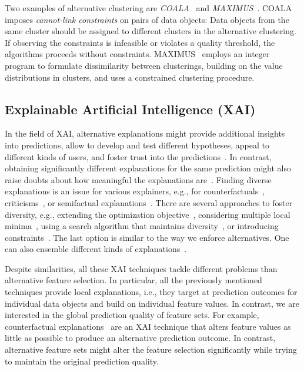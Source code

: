 \documentclass{article}
\theoremstyle{definition}
\begin{document}
Two examples of alternative clustering are \emph{COALA}~\cite{bae2006coala} and \emph{MAXIMUS}~\cite{bae2010clustering}.
COALA~\cite{bae2006coala} imposes \emph{cannot-link constraints} on pairs of data objects:
Data objects from the same cluster should be assigned to different clusters in the alternative clustering.
If observing the constraints is infeasible or violates a quality threshold, the algorithms proceeds without constraints.
MAXIMUS~\cite{bae2010clustering} employs an integer program to formulate dissimilarity between clusterings, building on the value distributions in clusters, and uses a constrained clustering procedure.

\subsection{Explainable Artificial Intelligence (XAI)}

In the field of XAI, alternative explanations might provide additional insights into predictions, allow to develop and test different hypotheses, appeal to different kinds of users, and foster trust into the predictions~\cite{kim2021multi, wang2019designing}.
In contrast, obtaining significantly different explanations for the same prediction might also raise doubts about how meaningful the explanations are~\cite{jain2019attention}.
Finding diverse explanations is an issue for various explainers, e.g., for counterfactuals~\cite{dandl2020multi, karimi2020model, mohammadi2021scaling, mothilal2020explaining, russell2019efficient, wachter2017counterfactual}, criticisms~\cite{kim2016examples}, or semifactual explanations~\cite{artelt2022even}.
There are several approaches to foster diversity, e.g., extending the optimization objective~\cite{artelt2022even, kim2016examples, mothilal2020explaining}, considering multiple local minima~\cite{wachter2017counterfactual}, using a search algorithm that maintains diversity~\cite{dandl2020multi}, or introducing constraints~\cite{karimi2020model, mohammadi2021scaling, russell2019efficient}.
The last option is similar to the way we enforce alternatives.
One can also ensemble different kinds of explanations~\cite{silva2019produce}.

Despite similarities, all these XAI techniques tackle different problems than alternative feature selection.
In particular, all the previously mentioned techniques provide local explanations, i.e., they target at prediction outcomes for individual data objects and build on individual feature values.
In contrast, we are interested in the global prediction quality of feature sets.
For example, counterfactual explanations~\cite{guidotti2022counterfactual, stepin2021survey, verma2020counterfactual} are an XAI technique that alters feature values as little as possible to produce an alternative prediction outcome.
In contrast, alternative feature sets might alter the feature selection significantly while trying to maintain the original prediction quality.
\end{document}
